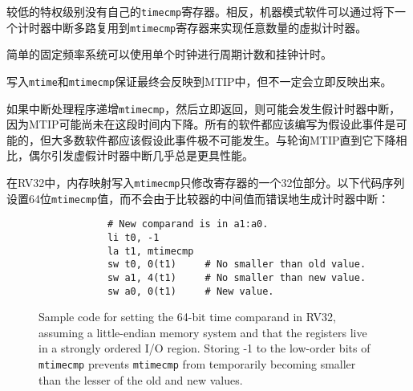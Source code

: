 {较低的特权级别没有自己的{\tt timecmp}寄存器。相反，机器模式软件可以通过将下一个计时器中断多路复用到{\tt mtimecmp}寄存器来实现任意数量的虚拟计时器。

简单的固定频率系统可以使用单个时钟进行周期计数和挂钟计时。

\iffalse
Writes to {\tt mtime} and {\tt mtimecmp} are guaranteed to be reflected in
MTIP eventually, but not necessarily immediately.
\fi
写入{\tt mtime}和{\tt mtimecmp}保证最终会反映到MTIP中，但不一定会立即反映出来。

\iffalse
\begin{commentary}
	A spurious timer interrupt might occur if an interrupt handler increments {\tt
		mtimecmp} then immediately returns, because MTIP might not yet have fallen in
	the interim.  All software should be written to assume this event is possible,
	but most software should assume this event is extremely unlikely.  It is
	almost always more performant to incur an occasional spurious timer interrupt
	than to poll MTIP until it falls.
\end{commentary}
\fi
\begin{commentary}
如果中断处理程序递增{\tt mtimecmp}，然后立即返回，则可能会发生假计时器中断，因为MTIP可能尚未在这段时间内下降。所有的软件都应该编写为假设此事件是可能的，但大多数软件都应该假设此事件极不可能发生。与轮询MTIP直到它下降相比，偶尔引发虚假计时器中断几乎总是更具性能。
\end{commentary}

\iffalse
In RV32, memory-mapped writes to {\tt mtimecmp} modify only one 32-bit
part of the register.  The following code sequence sets a 64-bit {\tt
	mtimecmp} value without spuriously generating a timer interrupt due
to the intermediate value of the comparand:
\fi
在RV32中，内存映射写入{\tt mtimecmp}只修改寄存器的一个32位部分。以下代码序列设置64位{\tt mtimecmp}值，而不会由于比较器的中间值而错误地生成计时器中断：

\begin{figure}[h!]
	\begin{center}
		\begin{verbatim}
			# New comparand is in a1:a0.
			li t0, -1
			la t1, mtimecmp
			sw t0, 0(t1)     # No smaller than old value.
			sw a1, 4(t1)     # No smaller than new value.
			sw a0, 0(t1)     # New value.
		\end{verbatim}
	\end{center}
	\caption{Sample code for setting the 64-bit time comparand in RV32, assuming
		a little-endian memory system and that the registers live in a strongly
		ordered I/O region.  Storing -1 to the low-order bits of {\tt mtimecmp}
		prevents {\tt mtimecmp} from temporarily becoming smaller than the lesser
		of the old and new values.}
	\label{mtimecmph}
\end{figure}

}
